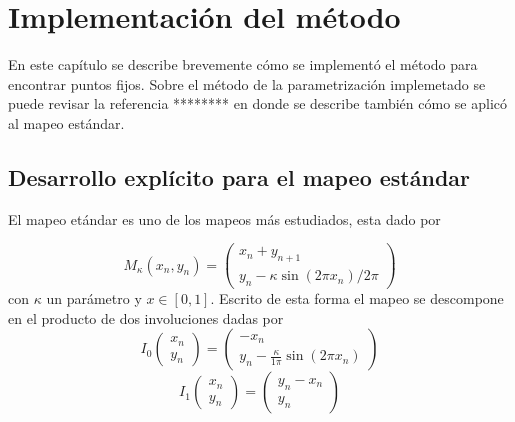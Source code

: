 
\chapter{Implementaci\'on del m\'etodo}
En este cap\'itulo se describe brevemente c\'omo se implement\'o el m\'etodo para encontrar puntos fijos. Sobre el m\'etodo de la parametrizaci\'on implemetado se puede revisar la referencia ******** en donde se describe tambi\'en c\'omo se aplic\'o al mapeo est\'andar. 

\section{Desarrollo explícito para el mapeo estándar}

El mapeo et\'andar es uno de los mapeos m\'as estudiados, esta dado por 

\begin{equation}
M_{\kappa}(x_{n},y_{n}) = 
\left(\begin{array}{c}
x_{n} +y_{n+1} \\
y_{n}-\kappa\sin(2\pi x_{n})/2\pi
\end{array}\right)
\label{mapeo estandar}
\end{equation}
con $\kappa$ un par\'ametro y $x\in [0,1]$. Escrito de esta forma el mapeo se descompone en el producto de dos involuciones dadas por
\begin{equation}
I_{0}\left( \begin{array}{c}
x_{n}\\
y_{n}
\end{array}\right) = 
\left(\begin{array}{c}
-x_{n}\\
y_{n}-\frac{\kappa}{1\pi}\sin(2\pi x_{n})
\end{array}
\right)
\label{involucionA}
\end{equation}
\begin{equation}
I_{1}\left( \begin{array}{c}
x_{n}\\
y_{n}
\end{array}\right) = 
\left(\begin{array}{c}
y_{n}-x_{n}\\
y_{n}
\end{array}
\right)
\label{involucionB}
\end{equation}

